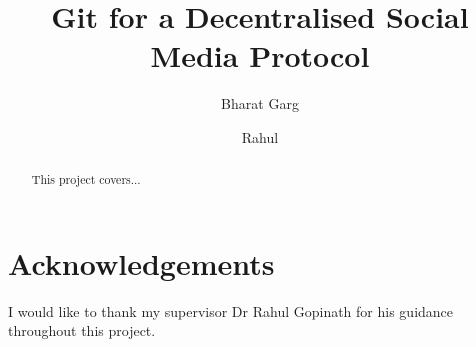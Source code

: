 \documentclass[manuscript,screen]{acmart}
\title{Git for a Decentralised Social Media Protocol}
\author{Bharat Garg}
\affiliation{
  \institution{University of Sydney}
  \city{Sydney}
  \country{Australia}
}
\author{Rahul}
\affiliation{
  \institution{University of Sydney}
  \city{Sydney}
  \country{Australia}
}
\begin{document}
\begin{abstract}
This project covers...
\end{abstract}


\maketitle

\section*{Acknowledgements}
I would like to thank my supervisor Dr Rahul Gopinath for his guidance throughout this project.

\tableofcontents
\listoffigures
\listoftables











\appendix







\end{document}
